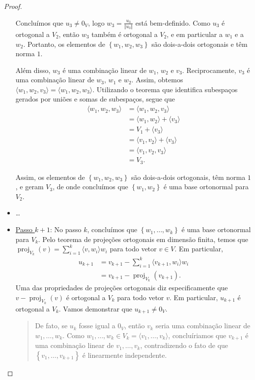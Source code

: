 \begin{proof}
\begin{itemize}
		Concluímos que $u_3\neq 0_V$, logo $w_3=\frac{u_3}{\Vert u_3\Vert}$ está bem-definido. Como $u_3$ é ortogonal a $V_2$, então $w_3$ também é ortogonal a $V_2$, e em particular a $w_1$ e a $w_2$. Portanto, os elementos de $\left\{w_1,w_2,w_3\right\}$ são dois-a-dois ortogonais e têm norma $1$.
		
		Além disso, $w_3$ é uma combinação linear de $w_1$, $w_2$ e $v_3$. Reciprocamente, $v_3$ é uma combinação linear de $w_3$, $w_1$ e $w_2$. Assim, obtemos $\langle w_1,w_2,v_3\rangle=\langle w_1,w_2,w_3\rangle$. Utilizando o teorema que identifica subespaços gerados por uniões e somas de subespaços, segue que
		\begin{align*}
			\langle w_1,w_2,w_3\rangle
				&=\langle w_1,w_2,v_3\rangle\\
				&=\langle w_1,w_2\rangle +\langle v_3\rangle\\
				&=V_1+\langle v_3\rangle\\
				&=\langle v_1,v_2\rangle+\langle v_3\rangle\\
				&=\langle v_1,v_2,v_3\rangle\\
				&=V_3.
		\end{align*}
		
		Assim, os elementos de $\left\{w_1,w_2,w_3\right\}$ são dois-a-dois ortogonais, têm norma $1$, e geram $V_3$, de onde concluímos que $\left\{w_1,w_2\right\}$ é uma base ortonormal para $V_2$.
		
		\item \ldots
		
		\item \uline{Passo $k+1$}: No passo $k$, concluímos que $\left\{w_1,\ldots,w_k\right\}$ é uma base ortonormal para $V_k$. Pelo teorema de projeções ortogonais em dimensão finita, temos que $\operatorname{proj}_{V_k}(v)=\sum_{i=1}^k\langle v,w_i\rangle w_i$ para todo vetor $v\in V$. Em particular,
		\begin{align*}
			u_{k+1}
				&=v_{k+1}-\sum_{i=1}^k\langle v_{k+1},w_i\rangle w_i\\
				&=v_{k+1}-\operatorname{proj}_{V_k}(v_{k+1}).
			\end{align*}
		Uma das propriedades de projeções ortogonais diz especificamente que $v-\operatorname{proj}_{V_k}(v)$ é ortogonal a $V_k$ para todo vetor $v$. Em particular, $u_{k+1}$ é ortogonal a $V_k$. Vamos demonstrar que $u_{k+1}\neq 0_V$.
		
		\begin{quote}
			De fato, se $u_k$ fosse igual a $0_V$, então $v_k$ seria uma combinação linear de $w_1,\ldots,w_k$. Como $w_1,\ldots,w_k\in V_k=\langle v_1,\ldots,v_k\rangle$, concluíriamos que $v_{k+1}$ é uma combinação linear de $v_1,\ldots,v_k$, contradizendo o fato de que $\left\{v_1,\ldots,v_{k+1}\right\}$ é linearmente independente.
		\end{quote}
		

\end{itemize}
\end{proof}
